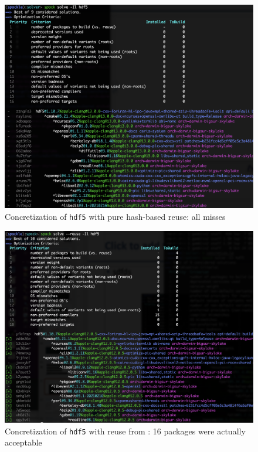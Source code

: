 \begin{figure}[h]
\includegraphics[width=\columnwidth]{figures/no-reuse.png}
\caption{Concretization of \texttt{hdf5} with pure hash-based reuse: all misses}
\label{fig:noreuse}
\end{figure}
\begin{figure}[h]
\includegraphics[width=\columnwidth]{figures/reuse.png}
\caption{Concretization of \texttt{hdf5} with reuse from \clingo: 16 packages were actually acceptable}
\label{fig:reuse}
\end{figure}



